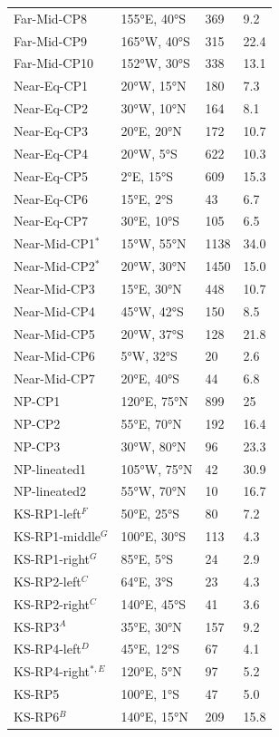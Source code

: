 \documentclass[preprint,11pt,3p,times,authoryear]{elsarticle}
\begin{document}
\begin{longtable}{p{4.0cm} p{3.0cm} p{2.0cm} p{3.0cm}}
Far-Mid-CP8 & 155°E, 40°S & 369 &  9.2\\
Far-Mid-CP9 & 165°W, 40°S & 315 &  22.4\\
Far-Mid-CP10 & 152°W, 30°S & 338 & 13.1 \\
Near-Eq-CP1 & 20°W, 15°N & 180 &  7.3\\
Near-Eq-CP2 & 30°W, 10°N & 164 &  8.1\\
Near-Eq-CP3 & 20°E, 20°N & 172 &  10.7\\
Near-Eq-CP4 & 20°W, 5°S & 622 &  10.3\\
Near-Eq-CP5 & 2°E, 15°S & 609 &  15.3\\
Near-Eq-CP6 & 15°E, 2°S & 43 &  6.7\\
Near-Eq-CP7 & 30°E, 10°S & 105 &  6.5\\
Near-Mid-CP1$^{*}$ & 15°W, 55°N & 1138 & 34.0 \\
Near-Mid-CP2$^{*}$ & 20°W, 30°N & 1450 & 15.0 \\
Near-Mid-CP3 & 15°E, 30°N & 448 &  10.7\\
Near-Mid-CP4 & 45°W, 42°S & 150 &  8.5\\
Near-Mid-CP5 & 20°W, 37°S & 128 &  21.8\\
Near-Mid-CP6 & 5°W, 32°S & 20 &  2.6\\
Near-Mid-CP7 & 20°E, 40°S & 44 &  6.8\\
NP-CP1 & 120°E, 75°N & 899 &  25\\
NP-CP2 & 55°E, 70°N & 192 &  16.4\\
NP-CP3 & 30°W, 80°N & 96 &  23.3\\
NP-lineated1 & 105°W, 75°N & 42 &  30.9\\
NP-lineated2 & 55°W, 70°N & 10 &  16.7\\
KS-RP1-left$^{F}$ & 50°E, 25°S & 80 &  7.2\\
KS-RP1-middle$^{G}$ & 100°E, 30°S & 113 &  4.3\\
KS-RP1-right$^{G}$ & 85°E, 5°S & 24 &  2.9\\
KS-RP2-left$^{C}$ & 64°E, 3°S & 23 &  4.3\\
KS-RP2-right$^{C}$ & 140°E, 45°S & 41 &  3.6\\
KS-RP3$^{A}$ & 35°E, 30°N & 157 &  9.2\\
KS-RP4-left$^{D}$ & 45°E, 12°S & 67 & 4.1 \\
KS-RP4-right$^{*,E}$ & 120°E, 5°N & 97 & 5.2 \\
KS-RP5 & 100°E, 1°S & 47 &  5.0 \\
KS-RP6$^{B}$ & 140°E, 15°N & 209 & 15.8 \\
\end{longtable}
\end{document}
